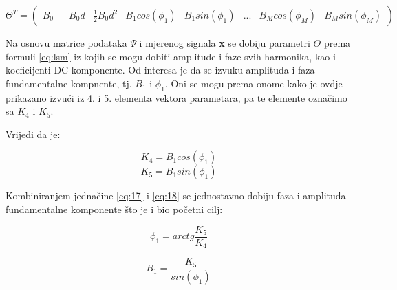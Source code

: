 \begin{equation}
{\Theta}^T = 
    \begin{pmatrix}
    B_0 & -B_0d  & \frac{1}{2} B_0 d^2  & B_1cos(\phi_1)  & B_1sin(\phi_1)  & ... & B_Mcos(\phi_M)  & B_Msin(\phi_M) 
    \end{pmatrix}
\end{equation}


Na osnovu matrice podataka $\Psi$ i mjerenog signala \textbf{x} se dobiju parametri $\Theta$ prema formuli \ref{eq:lsm} iz kojih se mogu dobiti amplitude i faze svih harmonika, kao i koeficijenti DC komponente. Od interesa je da se izvuku amplituda i faza fundamentalne kompnente, tj. $B_1$ i $\phi_1$. Oni se mogu prema onome kako je ovdje prikazano izvući iz 4. i 5. elementa vektora parametara, pa te elemente označimo sa $K_4$ i $K_5$.

Vrijedi da je:

\begin{equation}
    K_4 = B_1cos(\phi_1)
    \label{eq:17}
\end{equation}
\begin{equation}
    K_5 = B_1sin(\phi_1)
    \label{eq:18}
\end{equation}

Kombiniranjem jednačine \ref{eq:17} i \ref{eq:18} se jednostavno dobiju faza i amplituda fundamentalne komponente što je i bio početni cilj:

\begin{equation}
    \phi_1 = arctg\frac{K_5}{K_4}
    \label{eq:19}
\end{equation}

\begin{equation}
    B_1 = \frac{K_5}{sin(\phi_1)}
    \label{eq:110}
\end{equation}